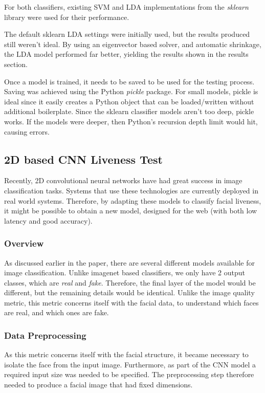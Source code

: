 \documentclass[11pt,a4paper]{article}
\begin{document}
            For both classifiers, existing SVM and LDA implementations from the \emph{sklearn} library were used for their performance. 
            
            The default sklearn LDA settings were initially used, but the results produced still weren't ideal. By using an eigenvector based solver, and automatic shrinkage, the LDA model performed far better, yielding the results
            shown in the results section.

            Once a model is trained, it needs to be saved to be used for the testing process. Saving was achieved using the Python \emph{pickle} package. For small models, pickle is ideal since it easily creates a Python object that can be loaded/written
            without additional boilerplate. Since the sklearn classifier models aren't too deep, pickle works. If the models were deeper, then Python's recursion depth limit would hit, causing errors. 
     
            
        \subsection{2D based CNN Liveness Test}
        Recently, 2D convolutional neural networks have had great success in image classification tasks. Systems that use these technologies are currently deployed in real world systems.
        Therefore, by adapting these models to classify facial liveness, it might be possible to obtain a new model, designed for the web (with both low latency and good accuracy).
        
            \subsubsection{Overview}
                As discussed earlier in the paper, there are several different models available for image classification. Unlike imagenet based classifiers, we only have 2 output classes, which are \emph{real} and \emph{fake}.
                Therefore, the final layer of the model would be different, but the remaining details would be identical. Unlike the image quality metric, this metric concerns itself with the facial data, to understand which faces
                are real, and which ones are fake.

            \subsubsection{Data Preprocessing}
                As this metric concerns itself with the facial structure, it became necessary to isolate the face from the input image. Furthermore, as part of the CNN model a required input size was needed to be specified. 
                The preprocessing step therefore needed to produce a facial image that had fixed dimensions.
\end{document}
